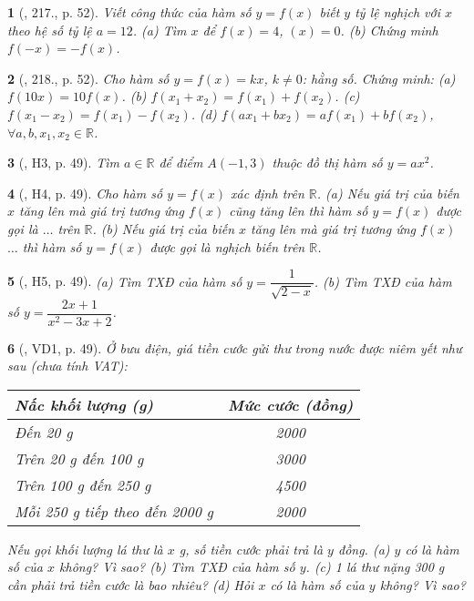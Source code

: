 \documentclass{article}
\newtheorem{baitoan}{}
\begin{document}
\begin{baitoan}[\cite{Tuyen_Toan_8}, 217., p. 52]
	Viết công thức của hàm số $y = f(x)$ biết $y$ tỷ lệ nghịch với $x$ theo hệ số tỷ lệ $a = 12$. (a) Tìm $x$ để $f(x) = 4$, $(x) = 0$. (b) Chứng minh $f(-x) = -f(x)$.
\end{baitoan}

\begin{baitoan}[\cite{Tuyen_Toan_8}, 218., p. 52]
	Cho hàm số $y = f(x) = kx$, $k\ne0$: hằng số. Chứng minh: (a) $f(10x) = 10f(x)$. (b) $f(x_1 + x_2) = f(x_1) + f(x_2)$. (c) $f(x_1 - x_2) = f(x_1) - f(x_2)$. (d) $f(ax_1 + bx_2) = af(x_1) + bf(x_2)$, $\forall a,b,x_1,x_2\in\mathbb{R}$.
\end{baitoan}

\begin{baitoan}[\cite{Binh_boi_duong_Toan_9_tap_1}, H3, p. 49]
	Tìm $a\in\mathbb{R}$ để điểm $A(-1,3)$ thuộc đồ thị hàm số $y = ax^2$.
\end{baitoan}

\begin{baitoan}[\cite{Binh_boi_duong_Toan_9_tap_1}, H4, p. 49]
	Cho hàm số $y = f(x)$ xác định trên $\mathbb{R}$. (a) Nếu giá trị của biến $x$ tăng lên mà giá trị tương ứng $f(x)$ cũng tăng lên thì hàm số $y = f(x)$ được gọi là $\ldots$ trên $\mathbb{R}$. (b) Nếu giá trị của biến $x$ tăng lên mà giá trị tương ứng $f(x)$ $\ldots$ thì hàm số $y = f(x)$ được gọi là nghịch biến trên $\mathbb{R}$.
\end{baitoan}

\begin{baitoan}[\cite{Binh_boi_duong_Toan_9_tap_1}, H5, p. 49]
	(a) Tìm {\rm TXĐ} của hàm số $y = \dfrac{1}{\sqrt{2 - x}}$. (b) Tìm {\rm TXĐ} của hàm số $y = \dfrac{2x + 1}{x^2 - 3x + 2}$.
\end{baitoan}

\begin{baitoan}[\cite{Binh_boi_duong_Toan_9_tap_1}, VD1, p. 49]
	Ở bưu điện, giá tiền cước gửi thư trong nước được niêm yết như sau (chưa tính {\rm VAT}):
	\begin{table}[H]
		\centering
		\begin{tabular}{|l|c|}
			\hline
			Nấc khối lượng (g) & Mức cước (đồng) \\
			\hline
			Đến 20 g & 2000 \\
			\hline
			Trên 20 g đến 100 g & 3000 \\
			\hline
			Trên 100 g đến 250 g & 4500 \\
			\hline
			Mỗi 250 g tiếp theo đến 2000 g & 2000 \\
			\hline
		\end{tabular}
	\end{table}
	\noindent Nếu gọi khối lượng lá thư là $x$ {\rm g}, số tiền cước phải trả là $y$ đồng. (a) $y$ có là hàm số của $x$ không? Vì sao? (b) Tìm {\rm TXĐ} của hàm số $y$. (c) 1 lá thư nặng {\rm300 g} cần phải trả tiền cước là bao nhiêu? (d) Hỏi $x$ có là hàm số của $y$ không? Vì sao?
\end{baitoan}
\end{document}
